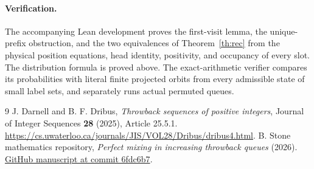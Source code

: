 \documentclass[11pt]{article}
\begin{document}
\paragraph{Verification.}
The accompanying Lean development proves the first-visit lemma, the unique-prefix
obstruction, and the two equivalences of Theorem~\ref{th:rec} from the physical position
equations, head identity, positivity, and occupancy of every slot. The distribution formula
is proved above. The exact-arithmetic verifier compares its probabilities with literal
finite projected orbits from every admissible state of small label sets, and separately
runs actual permuted queues.

\begin{thebibliography}{9}
 J. Darnell and B. F. Dribus, \emph{Throwback sequences of positive integers},
Journal of Integer Sequences \textbf{28} (2025), Article 25.5.1.
\url{https://cs.uwaterloo.ca/journals/JIS/VOL28/Dribus/dribus4.html}.
 B. Stone mathematics repository, \emph{Perfect mixing in increasing
throwback queues} (2026).
\href{https://github.com/blakestone-x/math/tree/6fdc6b705f6c8d04bc1a983871fc10a2afdce3d6/Throwback-mixing}{GitHub manuscript at commit 6fdc6b7}.
\end{thebibliography}
\end{document}
